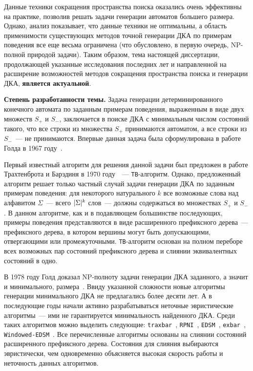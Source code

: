 Данные техники сокращения пространства поиска оказались очень эффективны на практике, позволив решать задачи генерации автоматов большего размера. Однако, анализ показывает, что данные техники не оптимальны, а область применимости существующих методов точной генерации ДКА по примерам поведения все еще весьма ограничена (что обусловлено, в первую очередь, NP-полной природой задачи). Таким образом, тема настоящей диссертации, продолжающей указанные исследования последних лет и направленной на расширение возможностей методов сокращения пространства поиска и генерации ДКА, \textbf{является актуальной}.

\textbf{Степень разработанности темы.}
Задача генерации детерминированного конечного автомата по заданным примерам поведения, выраженным в виде двух множеств $S_{+}$ и $S_{-}$, заключается в поиске ДКА с минимальным числом состояний такого, что все строки из множества $S_{+}$ принимаются автоматом, а все строки из $S_{-}$~--- не принимаются.
Впервые данная задача была сформулирована в работе Голда в 1967 году~\cite{DBLP:journals/iandc/Gold67}.

Первый известный алгоритм для решения данной задачи был предложен в работе Трахтенброта и Барздиня в 1970 году~\cite{trakhtenbrot-1973-modeling}~--- \texttt{TB}-алгоритм.
Однако, предложенный алгоритм решает только частный случай задачи генерации ДКА по заданным примерам поведения: для некоторого натурального $k$ все возможные слова над алфавитом $\Sigma$~--- всего $\lvert\Sigma\rvert^{k}$ слов~--- должны содержаться во множествах $S_{+}$ и $S_{-}$.
В данном алгоритме, как и в подавляющем большинстве последующих, примеры поведения представляются в виде расширенного префиксного дерева~--- префиксного дерева, в котором вершины могут быть допускающими, отвергающими или промежуточными.
\texttt{TB}-алгоритм основан на полном переборе всех возможных пар состояний префиксного дерева и слиянии эквивалентных состояний в одно.

В 1978 году Голд доказал NP-полноту задачи генерации ДКА заданного, а значит и минимального, размера~\cite{DBLP:journals/iandc/Gold78}.
Ввиду указанной сложности новые алгоритмы генерации минимального ДКА не предлагались более десяти лет.
А в последующие годы начали активно разрабатываться неточные эвристические алгоритмы~--- ими не гарантируется минимальность найденного ДКА.
Среди таких алгоритмов можно выделить следующие: \texttt{traxbar}~\cite{DBLP:conf/colt/Lang92}, \texttt{RPNI}~\cite{oncina-rpni-1992}, \texttt{EDSM}~\cite{DBLP:conf/icgi/LangPP98}, \texttt{exbar}~\cite{lang-1999-faster}, \texttt{Windowed-EDSM}~\cite{DBLP:conf/icgi/CicchelloK02}.
Все перечисленные алгоритмы основаны на слиянии состояний расширенного префиксного дерева.
Состояния для слияния выбираются эвристически, чем одновременно объясняется высокая скорость работы и неточность данных алгоритмов.

